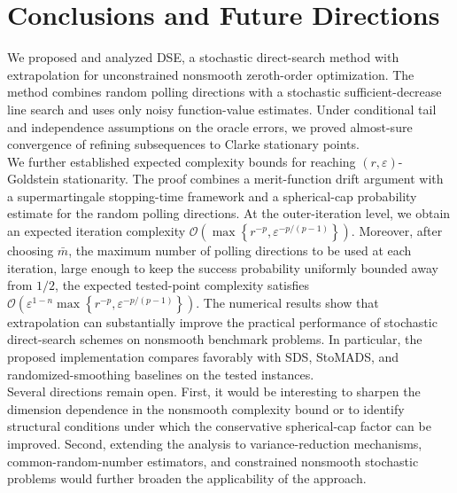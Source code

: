 \documentclass[11pt,a4paper]{article}
\begin{document}

\section{Conclusions and Future Directions}
\label{sec:conclusions}

We proposed and analyzed DSE, a stochastic direct-search method with extrapolation
for unconstrained nonsmooth zeroth-order optimization. The meth\-od combines random
polling directions with a stochastic sufficient-decrease line search and uses only noisy
function-value estimates. Under conditional tail and independence assumptions on the
oracle errors, we proved almost-sure convergence of refining subsequences to Clarke stationary
points.\\
We further established expected complexity bounds for reaching
\((r,\varepsilon)\)-Goldstein stationarity. The proof combines a merit-function
drift argument with a supermartingale stopping-time framework and a
spherical-cap probability estimate for the random polling directions. At the
outer-iteration level, we obtain an expected iteration complexity 
$\mathcal O\left(
        \max\left\{
            r^{-p},
            \varepsilon^{-p/(p-1)}
        \right\}
    \right).$
Moreover, after choosing $\bar{m}$, the maximum number of polling directions to be used at each iteration,  large enough to keep the
success probability uniformly bounded away from \(1/2\), the expected
tested-point complexity satisfies
$\mathcal O\left(
        \varepsilon^{1-n}
        \max\left\{
            r^{-p},
            \varepsilon^{-p/(p-1)}
        \right\}
    \right).$ The numerical results show that extrapolation can substantially improve the practical
performance of stochastic direct-search schemes on nonsmooth benchmark problems.
In particular, the proposed implementation compares favorably with SDS, StoMADS,
and randomized-smoothing baselines on the tested instances.\\
Several directions remain open. First, it would be interesting to sharpen the
dimension dependence in the nonsmooth complexity bound or to identify structural
conditions under which the conservative spherical-cap factor can be improved.  Second, extending the analysis to variance-reduction mechanisms,
common-random-number estimators, and constrained nonsmooth stochastic problems
would further broaden the applicability of the approach.
\end{document}
